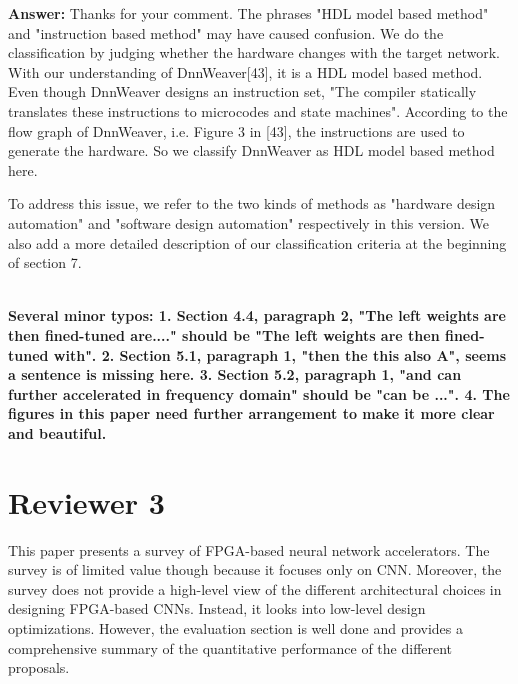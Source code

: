 \documentclass[12pt]{paper}
\newcommand{\rev}[1]{{{\color[rgb]{0,0,1}{#1}}}}
\newcommand{\reviewer}[1]{\section*{Reviewer #1}}
\newcommand{\answer}[1]{\noindent\textbf{Answer:} #1}
\newcommand{\comment}[1]{\noindent\textbf{#1}\\}
\begin{document}
\answer{Thanks for your comment. The phrases "HDL model based method" and "instruction based method" may have caused confusion. We do the classification by judging whether the hardware changes with the target network. With our understanding of DnnWeaver[43], it is a HDL model based method. Even though DnnWeaver designs an instruction set, "The compiler statically translates these instructions to microcodes and state machines". According to the flow graph of DnnWeaver, i.e. Figure 3 in [43], the instructions are used to generate the hardware. So we classify DnnWeaver as HDL model based method here. 

To address this issue, we refer to the two kinds of methods as "hardware design automation" and "software design automation" respectively in this version. We also add a more detailed description of our classification criteria at the beginning of section 7.

\rev{In certain application senarios, various NN models are to be supported with the FPGA accelerator. Whether the accelerator can response to the change in network model promptly and keeps high performance becomes a key feature. To address this problem, various researches have been carried out to automatically map a NN model to FPGA. Mainly two kinds of methods are used: hardware design automation and software design automation. Hardware design automation generates different hardware designs according to different NN models. Software design automation keeps a same accelerator and generates different inputs to the accelerator.}}\\

\comment{Several minor typos:
1. Section 4.4, paragraph 2, "The left weights are then fined-tuned are...." should be "The left weights are then fined-tuned with".
2. Section 5.1, paragraph 1, "then the this also A", seems a sentence is missing here.
3. Section 5.2, paragraph 1, "and can further accelerated in frequency domain" should be "can be ...".
4. The figures in this paper need further arrangement to make it more clear and beautiful.}

\reviewer{3}

This paper presents a survey of FPGA-based neural network accelerators. The survey is of limited value though because it focuses only on CNN. Moreover, the survey does not provide a high-level view of the different architectural choices in designing FPGA-based CNNs. Instead, it looks into low-level design optimizations. However, the evaluation section is well done and provides a comprehensive summary of the quantitative performance of the different proposals.\\
\end{document}
